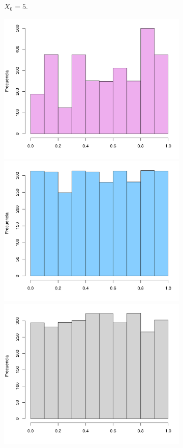 \documentclass[12pt]{article}
\begin{document}
\begin{figure}
\begin{subfigure}{\textwidth}
			\caption{$X_0 = 5$.}
			\label{semilla5}
		\end{subfigure}
		\begin{subfigure}{\textwidth}
			\centering
			\includegraphics[scale=0.34]{hist_59-11-43-97.png}
			\includegraphics[scale=0.34]{hist_59-59-43-97.png}
			\includegraphics[scale=0.34]{hist_59-613-919-857.png}

\end{subfigure}
\end{figure}
\end{document}
